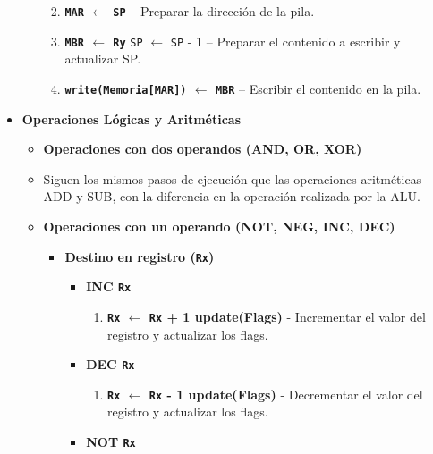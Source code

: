 \documentclass[12pt,oneside]{templates/unerthesis}
\providecommand{\tightlist}{%
  \setlength{\itemsep}{0pt}\setlength{\parskip}{0pt}}
\begin{document}
\begin{itemize}
\begin{itemize}
    \begin{enumerate}
    \def\labelenumi{\arabic{enumi}.}
    \setcounter{enumi}{3}
    \tightlist
    \item
      \textbf{\texttt{MAR} \(\leftarrow\) \texttt{SP}} -- Preparar la dirección de la pila.
    \item
      \textbf{\texttt{MBR} \(\leftarrow\) \texttt{Ry}} \textbar{} \texttt{SP} \(\leftarrow\) \texttt{SP} - 1 -- Preparar el contenido a escribir y actualizar SP.
    \item
      \textbf{\texttt{write(Memoria{[}MAR{]})} \(\leftarrow\) \texttt{MBR}} -- Escribir el contenido en la pila.
    \end{enumerate}
  \end{itemize}
\item
  \textbf{Operaciones Lógicas y Aritméticas}

  \begin{itemize}
  \item
    \textbf{Operaciones con dos operandos (AND, OR, XOR)}
  \item
    Siguen los mismos pasos de ejecución que las operaciones aritméticas ADD y SUB, con la diferencia en la operación realizada por la ALU.
  \item
    \textbf{Operaciones con un operando (NOT, NEG, INC, DEC)}

    \begin{itemize}
    \tightlist
    \item
      \textbf{Destino en registro (\texttt{Rx})}

      \begin{itemize}
      \tightlist
      \item
        \textbf{INC \texttt{Rx}}

        \begin{enumerate}
        \def\labelenumi{\arabic{enumi}.}
        \setcounter{enumi}{3}
        \tightlist
        \item
          \textbf{\texttt{Rx} \(\leftarrow\) \texttt{Rx} + 1 \textbar{} update(Flags)} - Incrementar el valor del registro y actualizar los flags.
        \end{enumerate}
      \item
        \textbf{DEC \texttt{Rx}}

        \begin{enumerate}
        \def\labelenumi{\arabic{enumi}.}
        \setcounter{enumi}{3}
        \tightlist
        \item
          \textbf{\texttt{Rx} \(\leftarrow\) \texttt{Rx} - 1 \textbar{} update(Flags)} - Decrementar el valor del registro y actualizar los flags.
        \end{enumerate}
      \item
        \textbf{NOT \texttt{Rx}}


\end{itemize}
\end{itemize}
\end{itemize}
\end{itemize}
\end{document}
